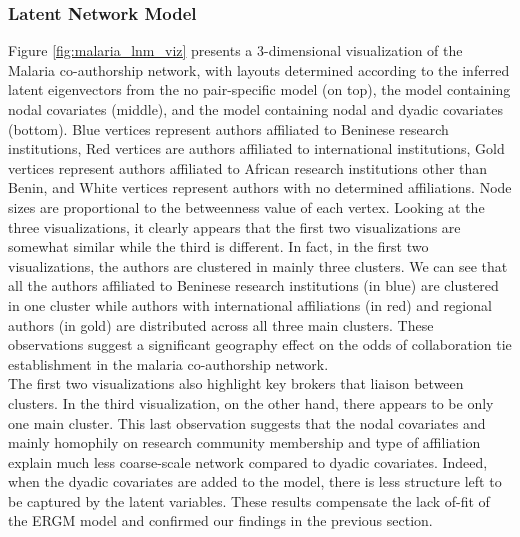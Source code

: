 \subsubsection{Latent Network Model}
\label{malaria_sec:results_lnm}
Figure \ref{fig:malaria_lnm_viz} presents a 3-dimensional visualization of the Malaria co-authorship network, with layouts determined according to the inferred latent eigenvectors from the no pair-specific model (on top), the model containing nodal covariates (middle), and the model containing nodal and dyadic covariates (bottom). Blue vertices represent authors affiliated to Beninese research institutions, Red vertices are authors affiliated to international institutions, Gold vertices represent authors affiliated to African research institutions other than Benin, and White vertices represent authors with no determined affiliations. Node sizes are proportional to the betweenness value of each vertex. Looking at the three visualizations, it clearly appears that the first two visualizations are somewhat similar while the third is different. In fact, in the first two visualizations, the authors are clustered in mainly three clusters. We can see that all the authors affiliated to Beninese research institutions (in blue) are clustered in one cluster while authors with international affiliations (in red) and regional authors (in gold) are distributed across all three main clusters. These observations suggest a significant geography effect on the odds of collaboration tie establishment in the malaria co-authorship network. \\The first two visualizations also highlight key brokers that liaison between clusters. In the third visualization, on the other hand, there appears to be only one main cluster. This last observation suggests that the nodal covariates and mainly homophily on research community membership and type of affiliation explain much less coarse-scale network compared to dyadic covariates. Indeed, when the dyadic covariates are added to the model, there is less structure left to be captured by the latent variables. These results compensate the lack of-fit of the ERGM model and confirmed our findings in the previous section.

